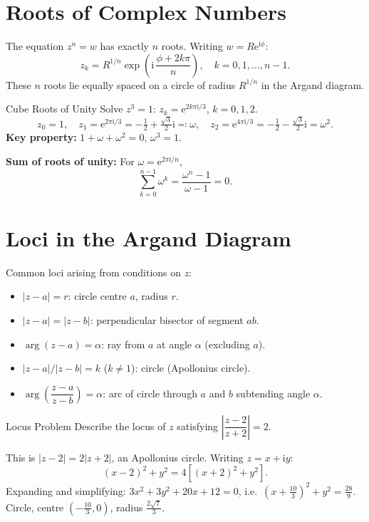 \documentclass[12pt, a4paper]{book}
\newenvironment{keyresult}{%
  \begin{tcolorbox}[keystyle]%
}{%
  \end{tcolorbox}%
}
\newcommand{\e}{\mathrm{e}}
\newcommand{\ii}{\mathrm{i}}
\begin{document}
\section{Roots of Complex Numbers}

The equation $\displaystyle z^n=w$ has exactly $\displaystyle n$ roots. Writing $\displaystyle w=R\e^{\ii\phi}$:
\[
z_k = R^{1/n}\exp\!\left(\ii\,\frac{\phi+2k\pi}{n}\right), \quad k=0,1,\ldots,n-1.
\]
These $\displaystyle n$ roots lie equally spaced on a circle of radius $R^{1/n}$ in the Argand diagram.

\begin{example}{Cube Roots of Unity}{}
Solve $\displaystyle z^3=1$: $z_k=\e^{2k\pi\ii/3}$, $\displaystyle k=0,1,2$.
\[
z_0=1,\quad z_1=\e^{2\pi\ii/3}=-\tfrac{1}{2}+\tfrac{\sqrt{3}}{2}\ii\eqqcolon\omega,\quad z_2=\e^{4\pi\ii/3}=-\tfrac{1}{2}-\tfrac{\sqrt{3}}{2}\ii=\omega^2.
\]
\textbf{Key property:} $\displaystyle 1+\omega+\omega^2=0$, $\displaystyle \omega^3=1$.
\end{example}

\begin{keyresult}
\textbf{Sum of roots of unity:} For $\displaystyle \omega=\e^{2\pi\ii/n}$,
\[
\sum_{k=0}^{n-1}\omega^k = \frac{\omega^n-1}{\omega-1} = 0.
\]
\end{keyresult}

\section{Loci in the Argand Diagram}

Common loci arising from conditions on $z$:
\begin{itemize}
  \item $\displaystyle |z-a|=r$: circle centre $a$, radius $r$.
  \item $\displaystyle |z-a|=|z-b|$: perpendicular bisector of segment $ab$.
  \item $\displaystyle \arg(z-a)=\alpha$: ray from $a$ at angle $\alpha$ (excluding $a$).
  \item $\displaystyle |z-a|/|z-b|=k$ ($k\neq1$): circle (Apollonius circle).
  \item $\displaystyle \arg\!\left(\dfrac{z-a}{z-b}\right)=\alpha$: arc of circle through $\displaystyle a$ and $\displaystyle b$ subtending angle $\displaystyle \alpha$.
\end{itemize}

\begin{example}{Locus Problem}{}
Describe the locus of $z$ satisfying $\left|\dfrac{z-2}{z+2}\right|=2$.

This is $|z-2|=2|z+2|$, an Apollonius circle. Writing $z=x+\ii y$:
\[
(x-2)^2+y^2 = 4[(x+2)^2+y^2].
\]
Expanding and simplifying: $3x^2+3y^2+20x+12=0$, i.e.\ $(x+\tfrac{10}{3})^2+y^2=\tfrac{28}{9}$. Circle, centre $(-\tfrac{10}{3},0)$, radius $\tfrac{2\sqrt{7}}{3}$.
\end{example}
\end{document}
